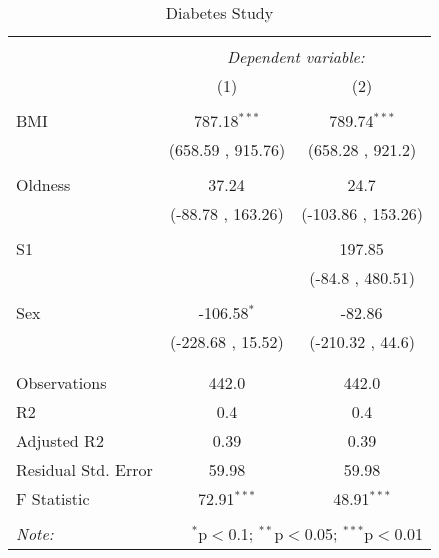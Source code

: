 \documentclass[12pt]{article}
\numberwithin{equation}{subsection}
\begin{document}
\begin{table}[!htbp] \centering
  \caption{Diabetes Study}
  \label{}
\begin{tabular}{@{\extracolsep{5pt}}lcc}
\\[-1.8ex]\hline
\hline \\[-1.8ex]
& \multicolumn{2}{c}{\textit{Dependent variable:}} \
\cr \cline{2-3}
\\[-1.8ex] & (1) & (2) \\
\hline \\[-1.8ex]
 BMI & 787.18$^{***}$ & 789.74$^{***}$ \\
  & (658.59 , 915.76) & (658.28 , 921.2) \\
  & & \\
 Oldness & 37.24$^{}$ & 24.7$^{}$ \\
  & (-88.78 , 163.26) & (-103.86 , 153.26) \\
  & & \\
 S1 & & 197.85$^{}$ \\
  & & (-84.8 , 480.51) \\
  & & \\
 Sex & -106.58$^{*}$ & -82.86$^{}$ \\
  & (-228.68 , 15.52) & (-210.32 , 44.6) \\
  & & \\
\hline \\[-1.8ex]
 Observations & 442.0 & 442.0 \\
 R${2}$ & 0.4 & 0.4 \\
 Adjusted R${2}$ & 0.39 & 0.39 \\
 Residual Std. Error & 59.98 & 59.98  \\
 F Statistic & 72.91$^{***}$  & 48.91$^{***}$  \\
\hline
\hline \\[-1.8ex]
\textit{Note:} & \multicolumn{2}{r}{$^{*}$p$<$0.1; $^{**}$p$<$0.05; $^{***}$p$<$0.01} \\
\end{tabular}
\end{table}
\end{document}
